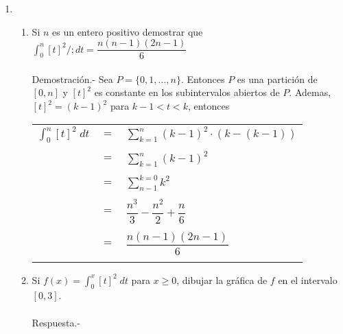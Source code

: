 \begin{enumerate}[ \bfseries 1.]
\begin{enumerate}[\bfseries (a)]
    \end{enumerate}

    \item 
    \begin{enumerate}[\bfseries (a)]
	
	\item Si $n$ es un entero positivo demostrar que $\displaystyle\int_{0}^{n} [t]^2 /; dt = \dfrac{n(n-1)(2n-1)}{6}$\\\\
	    Demostración.-\; Sea $P=\lbrace 0,1,...,n \rbrace$. Entonces $P$ es una partición de $[0,n]$ y $[t]^2$ es constante en los subintervalos abiertos de $P$. Ademas, $[t]^2=(k-1)^2$ para $k-1<t<k$, entonces 
	    \begin{center}
		\begin{tabular}{rcl}
		    $\displaystyle\int_{0}^{n} [t]^2 \; dt$&$=$&$\sum\limits_{k=1}^{n}(k-1)^2 \cdot (k-(k-1))$\\\\
		    &$=$&$\sum\limits_{k=1}^{n} (k-1)^2$\\\\
		    &$=$&$\sum\limits_{n-1}^{k=0} k^2$\\\\
		    &$=$&$\dfrac{n^3}{3}-\dfrac{n^2}{2}+\dfrac{n}{6}$\\\\
		    &$=$&$\dfrac{n(n-1)(2n-1)}{6}$\\\\
		\end{tabular}
	    \end{center}

	\item Si $f(x)=\displaystyle\int_{0}^{x} [t]^2 \; dt$ para $x\geq 0$, dibujar la gráfica de $f$ en el intervalo $[0,3]$.\\\\
	    Respuesta.-\; 
	    \begin{center}
	    \end{center}
	    \vspace{.5cm}


\end{enumerate}
\end{enumerate}
